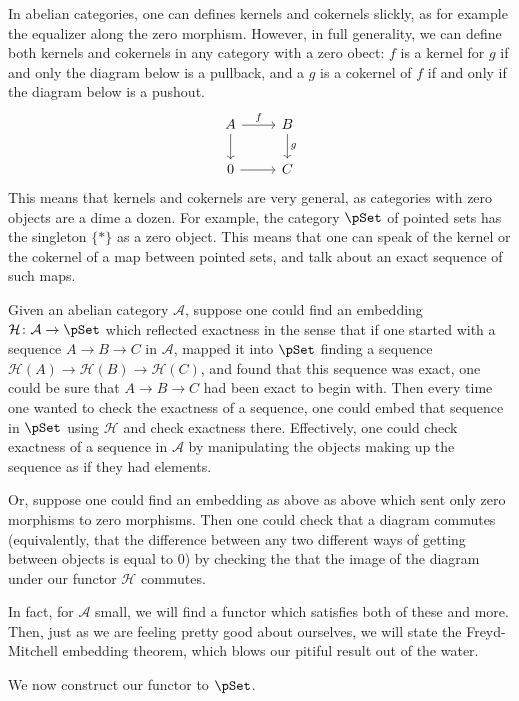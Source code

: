 \documentclass[main.tex]{subfiles}
\begin{document}
In abelian categories, one can defines kernels and cokernels slickly, as for example the equalizer along the zero morphism. However, in full generality, we can define both kernels and cokernels in any category with a zero obect: $f$ is a kernel for $g$ if and only the diagram below is a pullback, and a $g$ is a cokernel of $f$ if and only if the diagram below is a pushout.
\begin{equation*}
  \begin{tikzcd}
    A
    \arrow[r, "f"]
    \arrow[d]
    & B
    \arrow[d, "g"]
    \\
    0
    \arrow[r]
    & C
  \end{tikzcd}
\end{equation*}
This means that kernels and cokernels are very general, as categories with zero objects are a dime a dozen. For example, the category $\pSet$ of pointed sets has the singleton $\{*\}$ as a zero object. This means that one can speak of the kernel or the cokernel of a map between pointed sets, and talk about an exact sequence of such maps.

Given an abelian category $\mathcal{A}$, suppose one could find an embedding $\mathcal{H}\colon \mathcal{A} \to \pSet$ which reflected exactness in the sense that if one started with a sequence $A \to B \to C$ in $\mathcal{A}$, mapped it into $\pSet$ finding a sequence $\mathcal{H}(A) \to \mathcal{H}(B) \to \mathcal{H}(C)$, and found that this sequence was exact, one could be sure that $A \to B \to C$ had been exact to begin with. Then every time one wanted to check the exactness of a sequence, one could embed that sequence in $\pSet$ using $\mathcal{H}$ and check exactness there. Effectively, one could check exactness of a sequence in $\mathcal{A}$ by manipulating the objects making up the sequence as if they had elements.

Or, suppose one could find an embedding as above as above which sent only zero morphisms to zero morphisms. Then one could check that a diagram commutes (equivalently, that the difference between any two different ways of getting between objects is equal to $0$) by checking the that the image of the diagram under our functor $\mathcal{H}$ commutes.

In fact, for $\mathcal{A}$ small, we will find a functor which satisfies both of these and more. Then, just as we are feeling pretty good about ourselves, we will state the Freyd-Mitchell embedding theorem, which blows our pitiful result out of the water.

We now construct our functor to $\pSet$.
\end{document}
